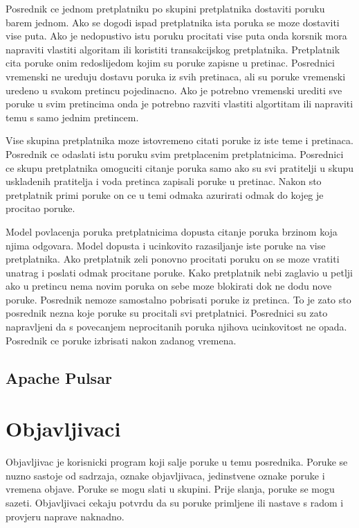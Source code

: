 \documentclass[times, utf8, diplomski, numeric]{fer}
\begin{document}
Posrednik ce jednom pretplatniku po skupini pretplatnika dostaviti poruku barem jednom. Ako se dogodi ispad pretplatnika ista poruka se moze dostaviti vise puta. Ako je nedopustivo istu poruku procitati vise puta onda korsnik mora napraviti vlastiti algoritam ili koristiti transakcijskog pretplatnika. Pretplatnik cita poruke onim redoslijedom kojim su poruke zapisne u pretinac. Posrednici vremenski ne ureduju dostavu poruka iz svih pretinaca, ali su poruke vremenski uredeno u svakom pretincu pojedinacno. Ako je potrebno vremenski urediti sve poruke u svim pretincima onda je potrebno razviti vlastiti algortitam ili napraviti temu s samo jednim pretincem.

Vise skupina pretplatnika moze istovremeno citati poruke iz iste teme i pretinaca. Posrednik ce odaslati istu poruku svim pretplacenim pretplatnicima. Posrednici ce skupu pretplatnika omoguciti citanje poruka samo ako su svi pratitelji u skupu uskladenih pratitelja i voda pretinca zapisali poruke u pretinac. Nakon sto pretplatnik primi poruke on ce u temi odmaka azurirati odmak do kojeg je procitao poruke.

Model povlacenja poruka pretplatnicima dopusta citanje poruka brzinom koja njima odgovara. Model dopusta i ucinkovito razasiljanje iste poruke na vise pretplatnika. Ako pretplatnik zeli ponovno procitati poruku on se moze vratiti unatrag i poslati odmak procitane poruke. Kako pretplatnik nebi zaglavio u petlji ako u pretincu nema novim poruka on sebe moze blokirati dok ne dodu nove poruke. Posrednik nemoze samostalno pobrisati poruke iz pretinca. To je zato sto posrednik nezna koje poruke su procitali svi pretplatnici. Posrednici su zato napravljeni da s povecanjem neprocitanih poruka njihova ucinkovitost ne opada. Posrednik ce poruke izbrisati nakon zadanog vremena.



\section{Apache Pulsar}



\chapter{Objavljivaci}
Objavljivac je korisnicki program koji salje poruke u temu posrednika. Poruke se nuzno sastoje od sadrzaja, oznake objavljivaca, jedinstvene oznake poruke i vremena objave. Poruke se mogu slati u skupini. Prije slanja, poruke se mogu sazeti. Objavljivaci cekaju potvrdu da su poruke primljene ili nastave s radom i provjeru naprave naknadno. 
\end{document}
